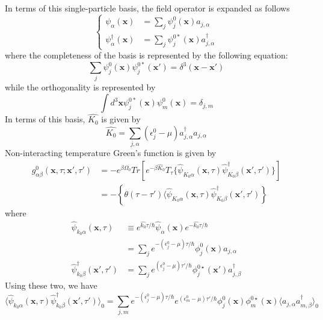 In terms of this single-particle basis, the field operator is expanded as follows
\begin{equation}
\left\{
\begin{aligned}
\psi_\alpha(\mathbf{x})&=\sum_j\psi_j^0(\mathbf{x})a_{j,\alpha}\\
\psi_\alpha^\dagger(\mathbf{x})&=\sum_j\psi_j^{0*}(\mathbf{x})a^\dagger_{j,\alpha}
\end{aligned}
\right.
\end{equation}
where the completeness of the basis is represented by the following equation:
\begin{equation}\label{eq4.5.16}
\sum_j\psi_j^0(\mathbf{x})\psi_j^{0*}(\mathbf{x}')=\delta^3(\mathbf{x}-\mathbf{x}')
\end{equation}
while the orthogonality is represented by
\begin{equation}
\int d^3\mathbf{x} \psi_j^{0*}(\mathbf{x})\psi_m^0(\mathbf{x}) =\delta_{j,m}
\end{equation}
In terms of this basis, $\hat{K_0}$ is given by
\begin{equation}
\hat{K_0}=\sum_{j,\alpha}(\epsilon_j^0-\mu)a_{j,\alpha}^\dagger a_{j,\alpha}
\end{equation}
Non-interacting temperature Green's function is given by
\[
\begin{aligned}
g_{\alpha\beta}^0(\mathbf{x},\tau;\mathbf{x}',\tau')&=-e^{\beta\Omega_0}Tr\left[e^{-\beta\hat{K}_0} T_\tau\{\hat{\psi}_{K_0\alpha}(\mathbf{x},\tau) \hat{\psi}_{K_0\beta}^\dagger(\mathbf{x}',\tau')\}\right]\\
&=-\left\{\theta(\tau-\tau')\langle\hat{\psi}_{K_0\alpha}(\mathbf{x},\tau)\hat{\psi}_{K_0\beta}^\dagger(\mathbf{x}',\tau')\right\}
\end{aligned}
\]
where 
\[
\begin{aligned}
\hat{\psi}_{k_0\alpha}(\mathbf{x},\tau) & \equiv e^{\hat{k_0}\tau/\hbar} \hat{\psi}_\alpha(\mathbf{x}) e^{-\hat{k_0}\tau/\hbar}\\
&=\sum_j e^{-(\epsilon^0_j-\mu)\tau/\hbar} \phi^0_j(\mathbf{x}) a_{j,\alpha}\\
\hat{\psi}_{k_0\beta}^\dag(\mathbf{x}',\tau')&=\sum_j e^{(\epsilon^0_j-\mu)\tau'/\hbar} \phi^{0\star}_j(\mathbf{x}') a^\dag_{j,\beta}
\end{aligned}
\]
Using these two, we have
\[
\langle \hat{\psi}_{k_0\alpha}(\mathbf{x},\tau) \hat{\psi}_{k_0\beta}^\dag(\mathbf{x}',\tau')\rangle_0
=\sum_{j,m}e^{-(\epsilon^0_j-\mu)\tau/\hbar} e^{(\epsilon^0_m-\mu)\tau'/\hbar} \phi_j^0(\mathbf{x})\phi_m^{0\star}(\mathbf{x}) \langle a_{j,\alpha}a^\dag_{m,\beta}\rangle_0
\]

